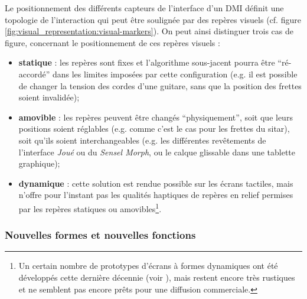 \noindent Le positionnement des différents capteurs de l'interface d'un \gls{DMI} définit une topologie de l'interaction qui peut être soulignée par des repères visuels (cf. figure \ref{fig:visual_representation:visual-markers}). On peut ainsi distinguer trois cas de figure, concernant le positionnement de ces repères visuels :
\vspace{-1em}
\begin{itemize}[noitemsep]
	\item \textbf{statique} : les repères sont fixes et l'algorithme sous-jacent pourra être ``ré-accordé'' dans les limites imposées par cette configuration (e.g. il est possible de changer la tension des cordes d'une guitare, sans que la position des frettes soient invalidée);
	\item \textbf{amovible} : les repères peuvent être changés ``physiquement'', soit que leurs positions soient réglables (e.g. comme c'est le cas pour les frettes du sitar), soit qu'ils soient interchangeables (e.g. les différentes revêtements de l'interface \textit{Joué} ou du \textit{Sensel Morph}, ou le calque glissable dans une tablette graphique);
	\item \textbf{dynamique} : cette solution est rendue possible sur les écrans tactiles, mais n'offre pour l'instant pas les qualités haptiques de repères en relief permises par les repères statiques ou amovibles\footnote{Un certain nombre de prototypes d'écrans à formes dynamiques ont été développés cette dernière décennie (voir \cite{follmer_inform_2013, siu_shapeshift_2018}), mais restent encore très rustiques et ne semblent pas encore prêts pour une diffusion commerciale.}.
\end{itemize}


\subsubsection{Nouvelles formes et nouvelles fonctions}

